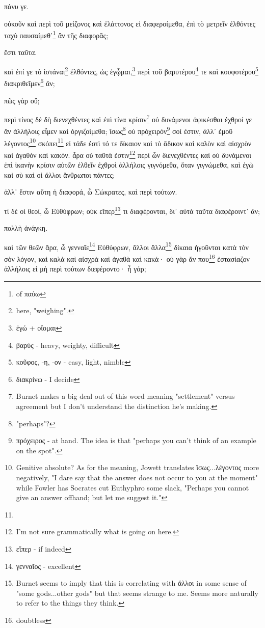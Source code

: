 πάνυ
γε.

οὐκοῦν
καὶ
περὶ
τοῦ
μείζονος
καὶ
ἐλάττονος
εἰ
διαφεροίμεθα,
ἐπὶ
τὸ
μετρεῖν
ἐλθόντες
ταχὺ
παυσαίμεθ᾽\footnote{ of παύω}
ἂν
τῆς
διαφορᾶς;

ἔστι
ταῦτα.

καὶ
ἐπί
γε
τὸ
ἱστάναι\footnote{here, "weighing".}
ἐλθόντες,
ὡς
ἐγᾦμαι,\footnote{ἐγώ + οἴομαι}
περὶ
τοῦ
βαρυτέρου\footnote{βαρύς - heavy, weighty, difficult}
τε
καὶ
κουφοτέρου\footnote{κοῦφος, -η, -ον - easy, light, nimble}
διακριθεῖμεν\footnote{διακρίνω - I decide}
ἄν;

πῶς
γὰρ
οὔ;

περὶ
τίνος
δὲ
δὴ
διενεχθέντες
καὶ
ἐπὶ
τίνα
κρίσιν\footnote{Burnet makes a big deal out of this word meaning "settlement" versus agreement but I don't understand the distinction he's making.}
οὐ
δυνάμενοι
ἀφικέσθαι
ἐχθροί
γε
ἂν
ἀλλήλοις
εἶμεν
καὶ
ὀργιζοίμεθα;
ἴσως\footnote{"perhaps"?}
οὐ
πρόχειρόν\footnote{πρόχειρος - at hand. The idea is that "perhaps you can't think of an example on the spot".}
σοί
ἐστιν,
ἀλλ᾽
ἐμοῦ
λέγοντος\footnote{Genitive absolute? As for the meaning, Jowett translates ἵσως...λέγοντος more negatively, "I dare say that the answer does not occur to you at the moment" while Fowler has Socrates cut Euthyphro some slack, "Perhaps you cannot give an answer offhand; but let me suggest it."}
\versification{[7d]}
σκόπει\footnote{}
εἰ
τάδε
ἐστὶ
τό
τε
δίκαιον
καὶ
τὸ
ἄδικον
καὶ
καλὸν
καὶ
αἰσχρὸν
καὶ
ἀγαθὸν
καὶ
κακόν.
ἆρα
οὐ
ταῦτά
ἐστιν\footnote{I'm not sure grammatically what is going on here.}
περὶ
ὧν
διενεχθέντες
καὶ
οὐ
δυνάμενοι
ἐπὶ
ἱκανὴν
κρίσιν
αὐτῶν
ἐλθεῖν
ἐχθροὶ
ἀλλήλοις
γιγνόμεθα,
ὅταν
γιγνώμεθα,
καὶ
ἐγὼ
καὶ
σὺ
καὶ
οἱ
ἄλλοι
ἄνθρωποι
πάντες;

ἀλλ᾽
ἔστιν
αὕτη
ἡ
διαφορά,
ὦ
Σώκρατες,
καὶ
περὶ
τούτων.

τί
δὲ
οἱ
θεοί,
ὦ
Εὐθύφρων;
οὐκ
εἴπερ\footnote{εἴπερ - if indeed}
τι
διαφέρονται,
δι᾽
αὐτὰ
ταῦτα
διαφέροιντ᾽
ἄν;

πολλὴ
ἀνάγκη.

\versification{[7e]}
καὶ
τῶν
θεῶν
ἄρα,
ὦ
γενναῖε\footnote{γενναῖος - excellent}
Εὐθύφρων,
ἄλλοι
ἄλλα\footnote{Burnet seems to imply that this is correlating with ἄλλοι in some sense of "some gods...other gods" but that seems strange to me. Seems more naturally to refer to the things they think.}
δίκαια
ἡγοῦνται
κατὰ
τὸν
σὸν
λόγον,
καὶ
καλὰ
καὶ
αἰσχρὰ
καὶ
ἀγαθὰ
καὶ
κακά·
οὐ
γὰρ
ἄν
που\footnote{doubtless}
ἐστασίαζον
ἀλλήλοις
εἰ
μὴ
περὶ
τούτων
διεφέροντο·
ἦ
γάρ;

